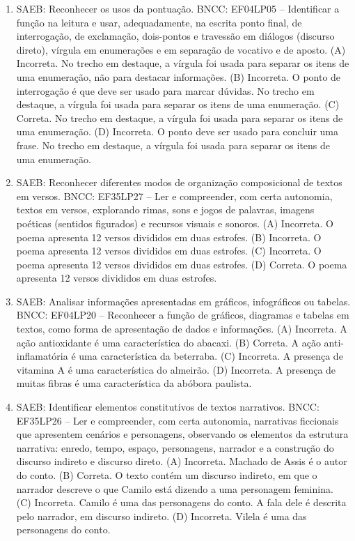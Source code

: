 \begin{enumerate}
\item
SAEB: Reconhecer os usos da pontuação. BNCC: EF04LP05 -- Identificar a função na leitura e usar, adequadamente, na escrita ponto final, de interrogação, de exclamação, dois-pontos e travessão em diálogos (discurso direto), vírgula em enumerações e em separação de vocativo e de aposto. 
(A) Incorreta. No trecho em destaque, a vírgula foi usada para separar os itens de uma enumeração, não para destacar informações. 
(B) Incorreta. O ponto de interrogação é que deve ser usado para marcar dúvidas. No trecho em destaque, a vírgula foi usada para separar os itens de uma enumeração. 
(C) Correta. No trecho em destaque, a vírgula foi usada para separar os itens de uma enumeração. 
(D) Incorreta. O ponto deve ser usado para concluir uma frase. No trecho em destaque, a vírgula foi usada para separar os itens de uma enumeração.

\item
SAEB: Reconhecer diferentes modos de organização composicional de textos em versos. BNCC: EF35LP27 -- Ler e compreender, com certa autonomia, textos em versos, explorando rimas, sons e jogos de palavras, imagens poéticas (sentidos figurados) e recursos visuais e sonoros. 
(A) Incorreta. O poema apresenta 12 versos divididos em duas estrofes. 
(B) Incorreta. O poema apresenta 12 versos divididos em duas estrofes. 
(C) Incorreta. O poema apresenta 12 versos divididos em duas estrofes. 
(D) Correta. O poema apresenta 12 versos divididos em duas estrofes.

\item
SAEB: Analisar informações apresentadas em gráficos, infográficos ou tabelas. BNCC: EF04LP20 -- Reconhecer a função de gráficos, diagramas e tabelas em textos, como forma de apresentação de dados e informações. 
(A) Incorreta. A ação antioxidante é uma característica do abacaxi. 
(B) Correta. A ação anti-inflamatória é uma característica da beterraba. 
(C) Incorreta. A presença de vitamina A é uma característica do almeirão. 
(D) Incorreta. A presença de muitas fibras é uma característica da abóbora paulista.

\item
SAEB: Identificar elementos constitutivos de textos narrativos. BNCC: EF35LP26 -- Ler e compreender, com certa autonomia, narrativas ficcionais que apresentem cenários e personagens, observando os elementos da estrutura narrativa: enredo, tempo, espaço, personagens, narrador e a construção do discurso indireto e discurso direto. 
(A) Incorreta. Machado de Assis é o autor do conto. 
(B) Correta. O texto contém um discurso indireto, em que o narrador descreve o que Camilo está dizendo a uma personagem feminina. 
(C) Incorreta. Camilo é uma das personagens do conto. A fala dele é descrita pelo narrador, em discurso indireto. 
(D) Incorreta. Vilela é uma das personagens do conto.


\end{enumerate}
